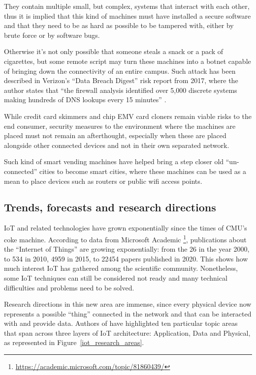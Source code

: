 			They contain multiple small, but complex, systems that interact with each other, thus it is implied that this kind of machines must have installed a secure software and that they need to be as hard as possible to be tampered with, either by brute force or by software bugs.
				
			Otherwise it's not only possible that someone steals a snack or a pack of cigarettes, but some remote script may turn these machines into a botnet capable of bringing down the connectivity of an entire campus.
			Such attack has been described in Verizon's ``Data Breach Digest'' risk report from 2017, where the author states that ``the firewall analysis identified over 5,000 discrete systems making hundreds of DNS lookups every 15 minutes'' \cite{DataBreachDigest}.
			
			While credit card skimmers and chip EMV card cloners remain viable risks to the end consumer, security measures to the environment where the machines are placed must not remain an afterthought, especially when these are placed alongside other connected devices and not in their own separated network.
			
			Such kind of smart vending machines have helped bring a step closer old ``un-connected'' cities to become smart cities, where these machines can be used as a mean to place devices such as routers or public wifi access points.
	
		\subsection{Trends, forecasts and research directions}
	
			IoT and related technologies have grown exponentially since the times of CMU's coke machine.
			According to data from Microsoft Academic \footnote{\url{https://academic.microsoft.com/topic/81860439/}}, publications about the ``Internet of Things'' are growing exponentially: from the 26 in the year 2000, to 534 in 2010, 4959 in 2015, to 22454 papers published in 2020.
			This shows how much interest IoT has gathered among the scientific community. Nonetheless, some IoT techniques can still be considered not ready and many technical difficulties and problems need to be solved.
	
			Research directions in this new area are immense, since every physical device now represents a possible ``thing'' connected in the network and that can be interacted with and provide data.
			Authors of \cite{9319033} have highlighted ten particular topic areas that span across three layers of IoT architecture: Application, Data and Physical, as represented in Figure~\ref{iot_research_areas}.
		
